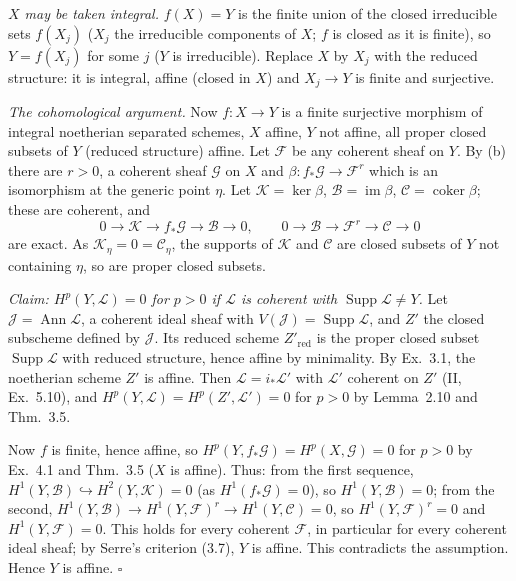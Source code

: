 \documentclass[11pt]{article}
\begin{document}
\emph{$X$ may be taken integral.} $f(X)=Y$ is the finite union of the closed irreducible sets $f(X_j)$ ($X_j$ the irreducible components of $X$; $f$ is closed as it is finite), so $Y=f(X_j)$ for some $j$ ($Y$ is irreducible). Replace $X$ by $X_j$ with the reduced structure: it is integral, affine (closed in $X$) and $X_j\to Y$ is finite and surjective.

\emph{The cohomological argument.} Now $f:X\to Y$ is a finite surjective morphism of integral noetherian separated schemes, $X$ affine, $Y$ not affine, all proper closed subsets of $Y$ (reduced structure) affine. Let $\mathcal F$ be any coherent sheaf on $Y$. By (b) there are $r>0$, a coherent sheaf $\mathcal G$ on $X$ and $\beta:f_*\mathcal G\to\mathcal F^r$ which is an isomorphism at the generic point $\eta$. Let $\mathcal K=\ker\beta$, $\mathcal B=\operatorname{im}\beta$, $\mathcal C=\operatorname{coker}\beta$; these are coherent, and
\[
0\to\mathcal K\to f_*\mathcal G\to\mathcal B\to0,\qquad 0\to\mathcal B\to\mathcal F^r\to\mathcal C\to0
\]
are exact. As $\mathcal K_\eta=0=\mathcal C_\eta$, the supports of $\mathcal K$ and $\mathcal C$ are closed subsets of $Y$ not containing $\eta$, so are proper closed subsets.

\emph{Claim: $H^p(Y,\mathcal L)=0$ for $p>0$ if $\mathcal L$ is coherent with $\operatorname{Supp}\mathcal L\ne Y$.} Let $\mathcal J=\operatorname{Ann}\mathcal L$, a coherent ideal sheaf with $V(\mathcal J)=\operatorname{Supp}\mathcal L$, and $Z'$ the closed subscheme defined by $\mathcal J$. Its reduced scheme $Z'_{\mathrm{red}}$ is the proper closed subset $\operatorname{Supp}\mathcal L$ with reduced structure, hence affine by minimality. By Ex.~3.1, the noetherian scheme $Z'$ is affine. Then $\mathcal L=i_*\mathcal L'$ with $\mathcal L'$ coherent on $Z'$ (II, Ex.~5.10), and $H^p(Y,\mathcal L)=H^p(Z',\mathcal L')=0$ for $p>0$ by Lemma~2.10 and Thm.~3.5.

Now $f$ is finite, hence affine, so $H^p(Y,f_*\mathcal G)=H^p(X,\mathcal G)=0$ for $p>0$ by Ex.~4.1 and Thm.~3.5 ($X$ is affine). Thus: from the first sequence, $H^1(Y,\mathcal B)\hookrightarrow H^2(Y,\mathcal K)=0$ (as $H^1(f_*\mathcal G)=0$), so $H^1(Y,\mathcal B)=0$; from the second, $H^1(Y,\mathcal B)\to H^1(Y,\mathcal F)^r\to H^1(Y,\mathcal C)=0$, so $H^1(Y,\mathcal F)^r=0$ and $H^1(Y,\mathcal F)=0$. This holds for every coherent $\mathcal F$, in particular for every coherent ideal sheaf; by Serre's criterion (3.7), $Y$ is affine. This contradicts the assumption. Hence $Y$ is affine. \hfill$\square$
\end{document}
